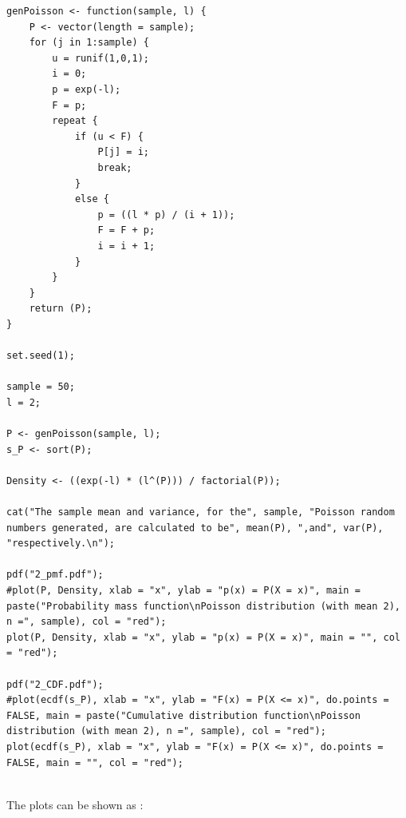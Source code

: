 \documentclass[11pt]{article}
\begin{document}
\begin{lstlisting}
genPoisson <- function(sample, l) {
	P <- vector(length = sample);
	for (j in 1:sample) {
		u = runif(1,0,1);
		i = 0;
		p = exp(-l);
		F = p; 
		repeat {
			if (u < F) {
				P[j] = i;
				break;
			}
			else {
				p = ((l * p) / (i + 1));
				F = F + p;
				i = i + 1;
			}
		}
	}
	return (P);	
}

set.seed(1);

sample = 50;
l = 2;

P <- genPoisson(sample, l);
s_P <- sort(P);

Density <- ((exp(-l) * (l^(P))) / factorial(P));

cat("The sample mean and variance, for the", sample, "Poisson random numbers generated, are calculated to be", mean(P), ",and", var(P), "respectively.\n");

pdf("2_pmf.pdf");
#plot(P, Density, xlab = "x", ylab = "p(x) = P(X = x)", main = paste("Probability mass function\nPoisson distribution (with mean 2), n =", sample), col = "red");
plot(P, Density, xlab = "x", ylab = "p(x) = P(X = x)", main = "", col = "red");

pdf("2_CDF.pdf");
#plot(ecdf(s_P), xlab = "x", ylab = "F(x) = P(X <= x)", do.points = FALSE, main = paste("Cumulative distribution function\nPoisson distribution (with mean 2), n =", sample), col = "red");
plot(ecdf(s_P), xlab = "x", ylab = "F(x) = P(X <= x)", do.points = FALSE, main = "", col = "red");
\end{lstlisting}
\newpage
{}\\
The plots can be shown as :
\end{document}
